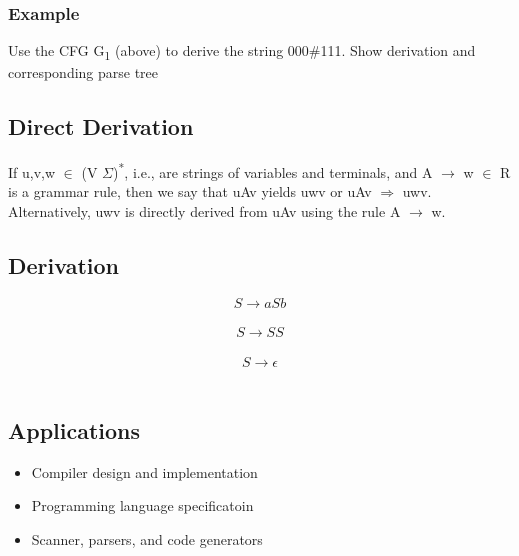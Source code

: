 \documentclass[11pt]{article}
\begin{document}
\subsubsection{Example}
\label{sec:org65bf778}
Use the CFG G\textsubscript{1} (above) to derive the string 000\#111. Show derivation and corresponding parse tree\\
\subsection{Direct Derivation}
\label{sec:org9ccd111}
If u,v,w \(\in\) (V \union \(\Sigma\))\textsuperscript{*}, i.e., are strings of variables and terminals, and A \(\rightarrow\) w \(\in\) R is a grammar rule, then we say that uAv yields uwv or uAv \(\Rightarrow\) uwv. Alternatively, uwv is directly derived from uAv using the rule A \(\rightarrow\) w.\\
\subsection{Derivation}
\label{sec:org54b9b75}
\[
S \rightarrow aSb
\]\\
\[
S \rightarrow SS
\]\\
\[
S \rightarrow \epsilon
\]\\
\subsection{Applications}
\label{sec:orgfc372ad}
\begin{itemize}
\item Compiler design and implementation\\
\item Programming language specificatoin\\
\item Scanner, parsers, and code generators\\
\end{itemize}
\end{document}
